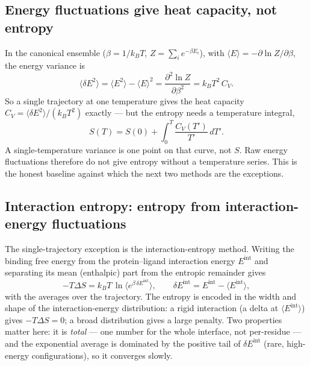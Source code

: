 \subsection{Energy fluctuations give heat capacity, not entropy}
In the canonical ensemble ($\beta = 1/k_B T$, $Z=\sum_i e^{-\beta E_i}$), with $\langle E\rangle =
-\partial\ln Z/\partial\beta$, the energy variance is
\begin{equation}
\langle \delta E^2\rangle = \langle E^2\rangle - \langle E\rangle^2
   = \frac{\partial^2 \ln Z}{\partial\beta^2} = k_B T^2\, C_V .
\end{equation}
So a single trajectory at one temperature gives the heat capacity $C_V =
\langle\delta E^2\rangle/(k_B T^2)$ exactly --- but the entropy needs a temperature integral,
\begin{equation}
S(T) = S(0) + \int_0^{T} \frac{C_V(T')}{T'}\,dT' .
\end{equation}
A single-temperature variance is one point on that curve, not $S$. Raw energy fluctuations therefore
do not give entropy without a temperature series. This is the honest baseline against which the next
two methods are the exceptions.

\subsection{Interaction entropy: entropy from interaction-energy fluctuations}
The single-trajectory exception is the interaction-entropy method. Writing the binding free energy
from the protein--ligand interaction energy $E^{\mathrm{int}}$ and separating its mean (enthalpic)
part from the entropic remainder gives
\begin{equation}
-T\Delta S = k_B T \,\ln\big\langle e^{\beta\,\delta E^{\mathrm{int}}}\big\rangle ,
\qquad \delta E^{\mathrm{int}} = E^{\mathrm{int}} - \langle E^{\mathrm{int}}\rangle ,
\end{equation}
with the averages over the trajectory. The entropy is encoded in the width and shape of the
interaction-energy distribution: a rigid interaction (a delta at $\langle E^{\mathrm{int}}\rangle$)
gives $-T\Delta S = 0$; a broad distribution gives a large penalty. Two properties matter here: it is
\emph{total} --- one number for the whole interface, not per-residue --- and the exponential average
is dominated by the positive tail of $\delta E^{\mathrm{int}}$ (rare, high-energy configurations), so
it converges slowly.

